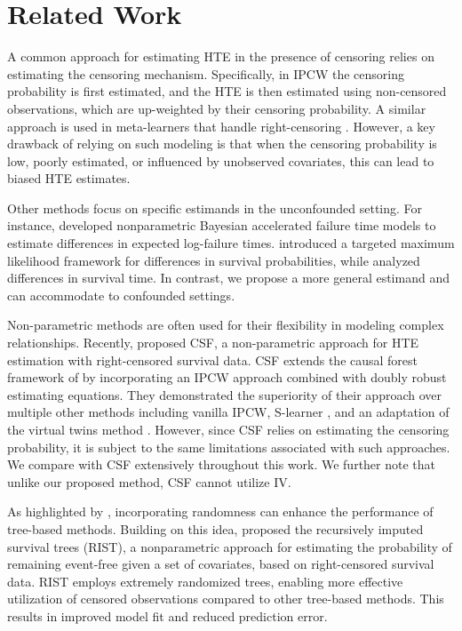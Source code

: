 \section{Related Work}
A common approach for estimating HTE in the presence of censoring relies on estimating the censoring mechanism. Specifically, in IPCW \citep{robins_estimation_1994} the censoring probability is first estimated, and the HTE is then estimated using non-censored observations, which are up-weighted by their censoring probability. A similar approach is used in meta-learners that handle right-censoring \citep{golmakani_superlearner_2020, bo_metalearner_2024}. However, a key drawback of relying on such modeling is that when the censoring probability is low, poorly estimated, or influenced by unobserved covariates, this can lead to biased HTE estimates.

Other methods focus on  specific estimands in the unconfounded setting. For instance, \citet{hendersen_individualized_2020} developed nonparametric Bayesian accelerated failure time models to estimate differences in expected log-failure times. \citet{zhu_targeted_2020} introduced a targeted maximum likelihood framework for differences in survival probabilities, while \citet{chapfuwa_enabling_2021} analyzed differences in survival time. In contrast, we propose a more general estimand and can accommodate to confounded settings. 

Non-parametric methods are often used for their flexibility in modeling complex relationships. Recently, \citet{cui_estimating_2023} proposed CSF, a non-parametric approach for HTE estimation with right-censored survival data. CSF extends the causal forest framework of \citet{athey_generalized_2019} by incorporating an IPCW approach combined with doubly robust estimating equations. They demonstrated the superiority of their approach over multiple other methods including vanilla IPCW, S-learner \citep{kunzel_metalearners_2019}, and an adaptation of the virtual twins method \citep{foster_subgroup_2011}. However, since CSF relies on estimating the censoring probability, it is subject to the same limitations associated with such approaches. We compare with CSF extensively throughout this work. We further note that unlike our proposed method, CSF cannot utilize IV. 



As highlighted by \citet{goos_ensemble_2000}, incorporating randomness can enhance the performance of tree-based methods. Building on this idea, \citet{zhu_recursively_2012} proposed the recursively imputed survival trees (RIST), a nonparametric approach for estimating the probability of remaining event-free given a set of covariates, based on right-censored survival data. RIST employs extremely randomized trees, enabling more effective utilization of censored observations compared to other tree-based methods. This results in improved model fit and reduced prediction error.

